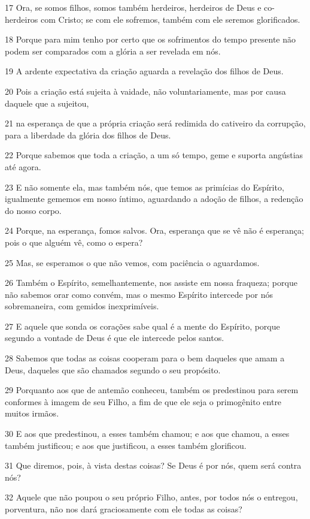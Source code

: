 \par 17 Ora, se somos filhos, somos também herdeiros, herdeiros de Deus e co-herdeiros com Cristo; se com ele sofremos, também com ele seremos glorificados.
\par 18 Porque para mim tenho por certo que os sofrimentos do tempo presente não podem ser comparados com a glória a ser revelada em nós.
\par 19 A ardente expectativa da criação aguarda a revelação dos filhos de Deus.
\par 20 Pois a criação está sujeita à vaidade, não voluntariamente, mas por causa daquele que a sujeitou,
\par 21 na esperança de que a própria criação será redimida do cativeiro da corrupção, para a liberdade da glória dos filhos de Deus.
\par 22 Porque sabemos que toda a criação, a um só tempo, geme e suporta angústias até agora.
\par 23 E não somente ela, mas também nós, que temos as primícias do Espírito, igualmente gememos em nosso íntimo, aguardando a adoção de filhos, a redenção do nosso corpo.
\par 24 Porque, na esperança, fomos salvos. Ora, esperança que se vê não é esperança; pois o que alguém vê, como o espera?
\par 25 Mas, se esperamos o que não vemos, com paciência o aguardamos.
\par 26 Também o Espírito, semelhantemente, nos assiste em nossa fraqueza; porque não sabemos orar como convém, mas o mesmo Espírito intercede por nós sobremaneira, com gemidos inexprimíveis.
\par 27 E aquele que sonda os corações sabe qual é a mente do Espírito, porque segundo a vontade de Deus é que ele intercede pelos santos.
\par 28 Sabemos que todas as coisas cooperam para o bem daqueles que amam a Deus, daqueles que são chamados segundo o seu propósito.
\par 29 Porquanto aos que de antemão conheceu, também os predestinou para serem conformes à imagem de seu Filho, a fim de que ele seja o primogênito entre muitos irmãos.
\par 30 E aos que predestinou, a esses também chamou; e aos que chamou, a esses também justificou; e aos que justificou, a esses também glorificou.
\par 31 Que diremos, pois, à vista destas coisas? Se Deus é por nós, quem será contra nós?
\par 32 Aquele que não poupou o seu próprio Filho, antes, por todos nós o entregou, porventura, não nos dará graciosamente com ele todas as coisas?
